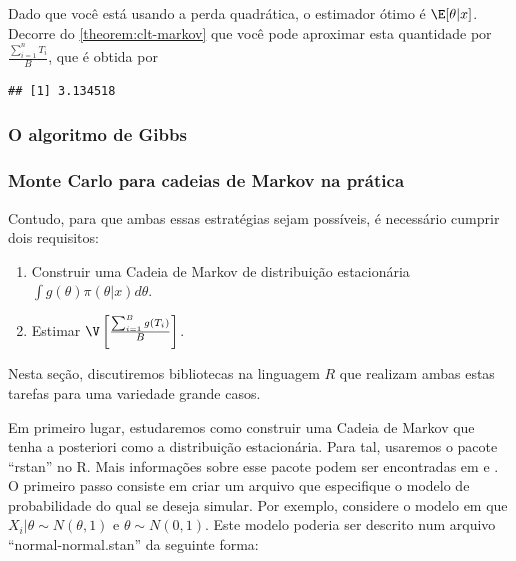 \begin{example}
\begin{knitrout}
\begin{kframe}
\begin{alltt}
\end{alltt}
\end{kframe}
\end{knitrout}
Dado que você está usando a perda quadrática,
o estimador ótimo é $\E[\theta|x]$.
Decorre do \cref{theorem:clt-markov} que
você pode aproximar esta quantidade por
$\frac{\sum_{i=1}^{n}{T_{i}}}{B}$, que é
obtida por
\begin{knitrout}
\color{fgcolor}\begin{kframe}
\begin{alltt}
\hlstd{(}\hlstd{(}\hlstd{(}\hlopt{^}\hlstd{,}
\end{alltt}
\begin{verbatim}
## [1] 3.134518
\end{verbatim}
\end{kframe}
\end{knitrout}
\end{example}

\subsubsection{O algoritmo de Gibbs}
\label{subsec:gibbs}


\subsubsection{Monte Carlo para cadeias de Markov na prática}

Contudo, para que ambas essas estratégias sejam possíveis,
é necessário cumprir dois requisitos:
\begin{enumerate}
 \item Construir uma Cadeia de Markov de distribuição estacionária $\int{g(\theta)\pi(\theta|x)d\theta}$.
 \item Estimar $\V\left[\frac{\sum_{i=1}^{B}{g(T_{i})}}{B}\right]$.
\end{enumerate}
Nesta seção, discutiremos bibliotecas
na linguagem $R$ que realizam ambas estas tarefas
para uma variedade grande casos.

Em primeiro lugar, 
estudaremos como construir uma Cadeia de Markov
que tenha a posteriori como a distribuição estacionária.
Para tal, usaremos o pacote ``rstan'' no R.
Mais informações sobre esse pacote 
podem ser encontradas em \citet{Gelman2014} e \citet{Stan2015}.
O primeiro passo consiste em criar um arquivo
que especifique o modelo de probabilidade do qual se deseja simular.
Por exemplo, considere o modelo em que $X_{i}|\theta \sim N(\theta,1)$
e $\theta \sim N(0,1)$. 
Este modelo poderia ser descrito num arquivo ``normal-normal.stan'' da seguinte forma:

